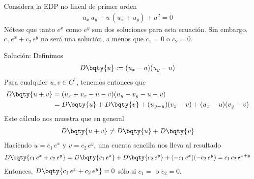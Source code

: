 \begin{ejemplo}
Considera la EDP no lineal de primer orden
\begin{align*}
u_{x} \, u_{y} - u \, (u_{x} + u_{y}) + u^{2} = 0
\end{align*}
Nótese que tanto $e^{x}$ como $e^{y}$ son dos soluciones para esta ecuación. Sin embargo, $c_{1} \, e^{x} + c_{2} \, e^{y}$ no será una solución, a menos que $c_{1} = 0$ o $c_{2} = 0$.
\par
Solución: Definimos
\begin{align*}
D \bqty{u} := (u_{x} - u)(u_{y} - u)
\end{align*}
Para cualquier $u, v \in C^{1}$, tenemos entonces que
\begin{align*}
D \bqty{u + v} &= (u_{x}  + v_{x} - u - v)(u_{y} - v_{y} - u -v) \\
&= D \bqty{u} + D \bqty{v} + (u_{y - u})(v_{x} - v) + (u_{x} - u)(v_{y} - v)
\end{align*}
Este cálculo nos muestra que en general
\begin{align*}
D \bqty{u + v} \neq D \bqty{u} + D \bqty{v}
\end{align*}
Haciendo $u = c_{1} \, e^{x}$ y $v = c_{2} \, e^{y}$, una cuenta sencilla nos lleva al resultado
\begin{align*}
D \bqty{c_{1} \, e^{x} + c_{2} \, e^{y}} = D \bqty{c_{1} \, e^{x}} + D \bqty{c_{2} \, e^{y}} + (-c_{1} \, e^{x})(-c_{2} \, e^{y}) = c_{1} \, c_{2} \, e^{x + y} 
\end{align*}
Entonces, $D \bqty{c_{1} \, e^{x} + c_{2} \, e^{y}} = 0$ sólo si $c_{1} = $ o $c_{2} = 0$.
\end{ejemplo}
